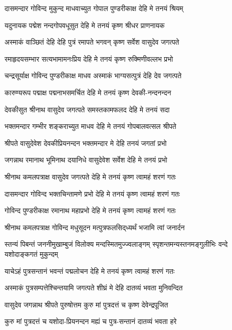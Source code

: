 \twolineshloka
{दासमन्दार गोविन्द मुकुन्द माधवाच्युत}
{गोपाल पुण्डरीकाक्ष देहि मे तनयं श्रियम्}%

\twolineshloka
{यदुनायक पद्मेश नन्दगोपवधूसुत}
{देहि मे तनयं कृष्ण श्रीधर प्राणनायक}%

\twolineshloka
{अस्माकं वाञ्छितं देहि देहि पुत्रं रमापते}
{भगवन् कृष्ण सर्वेश वासुदेव जगत्पते}%

\twolineshloka
{रमाहृदयसम्भार सत्यभामामनःप्रिय}
{देहि मे तनयं कृष्ण रुक्मिणीवल्लभ प्रभो}%

\twolineshloka
{चन्द्रसूर्याक्ष गोविन्द पुण्डरीकाक्ष माधव}
{अस्माकं भाग्यसत्पुत्रं देहि देव जगत्पते}%

\twolineshloka
{कारुण्यरूप पद्माक्ष पद्मनाभसमर्चित}
{देहि मे तनयं कृष्ण देवकी-नन्दनन्दन}%

\twolineshloka
{देवकीसुत श्रीनाथ वासुदेव जगत्पते}
{समस्तकामफलद देहि मे तनयं सदा}%

\twolineshloka
{भक्तमन्दार गम्भीर शङ्कराच्युत माधव}
{देहि मे तनयं गोपबालवत्सल श्रीपते}%

\twolineshloka
{श्रीपते वासुदेवेश देवकीप्रियनन्दन}
{भक्तमन्दार मे देहि तनयं जगतां प्रभो}%

\twolineshloka
{जगन्नाथ रमानाथ भूमिनाथ दयानिधे}
{वासुदेवेश सर्वेश देहि मे तनयं प्रभो}%

\twolineshloka
{श्रीनाथ कमलपत्राक्ष वासुदेव जगत्पते}
{देहि मे तनयं कृष्ण त्वामहं शरणं गतः}%

\twolineshloka
{दासमन्दार गोविन्द भक्तचिन्तामणे प्रभो}
{देहि मे तनयं कृष्ण त्वामहं शरणं गतः}%

\twolineshloka
{गोविन्द पुण्डरीकाक्ष रमानाथ महाप्रभो}
{देहि मे तनयं कृष्ण त्वामहं शरणं गतः}%

\twolineshloka
{श्रीनाथ कमलपत्राक्ष गोविन्द मधुसूदन}
{मत्पुत्रफलसिद्‌ध्यर्थं भजामि त्वां जनार्दन}%

\fourlineindentedshloka
{स्तन्यं पिबन्तं जननीमुखाम्बुजं}
{विलोक्य मन्दस्मितमुज्ज्वलाङ्गम्}
{स्पृशन्तमन्यस्तनमङ्गुलीभिः}
{वन्दे यशोदाङ्कगतं मुकुन्दम्}%

\twolineshloka
{याचेऽहं पुत्रसन्तानं भवन्तं पद्मलोचन}
{देहि मे तनयं कृष्ण त्वामहं शरणं गतः}%

\twolineshloka
{अस्माकं पुत्रसम्पत्तेश्चिन्तयामि जगत्पते}
{शीघ्रं मे देहि दातव्यं भवता मुनिवन्दित}%

\twolineshloka
{वासुदेव जगन्नाथ श्रीपते पुरुषोत्तम}
{कुरु मां पुत्रदत्तं च कृष्ण देवेन्द्रपूजित}%

\twolineshloka
{कुरु मां पुत्रदत्तं च यशोदा-प्रियनन्दन}
{मह्यं च पुत्र-सन्तानं दातव्यं भवता हरे}%

